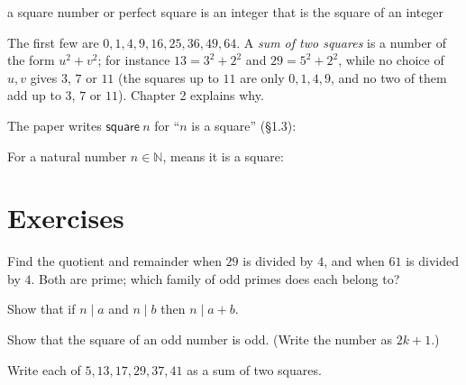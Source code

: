 \bpush\begin{bquote}

a square number or perfect
square is an integer that is the square of an integer

\end{bquote}\bpop

The first few are \(0, 1, 4, 9, 16, 25, 36, 49, 64\). A \emph{sum of two
squares} is a number of the form \(u^2 + v^2\); for instance
\(13 = 3^2 + 2^2\) and \(29 = 5^2 + 2^2\), while no choice of \(u, v\)
gives \(3\), \(7\) or \(11\) (the squares up to \(11\) are only
\(0, 1, 4, 9\), and no two of them add up to \(3\), \(7\) or \(11\)).
Chapter 2 explains why.

\bpush\begin{binpaper}

The paper writes \(\mathsf{square}\ n\) for ``\(n\) is a square''
(§1.3):

\bpush\begin{bquote}

For a natural number
\(n \in \mathbb{N}\), 
means it is a square:

\end{bquote}\bpop

\end{binpaper}\bpop

\hypertarget{exercises}{%
\section{Exercises}\label{exercises}}

\bpush\begin{bexercise}

Find the quotient and remainder when \(29\) is divided by \(4\), and
when \(61\) is divided by \(4\). Both are prime; which family of odd
primes does each belong to?

\end{bexercise}\bpop

\bpush\begin{bexercise}

Show that if \(n \mid a\) and \(n \mid b\) then \(n \mid a + b\).

\end{bexercise}\bpop

\bpush\begin{bexercise}

Show that the square of an odd number is odd. (Write the number as
\(2k + 1\).)

\end{bexercise}\bpop

\bpush\begin{bexercise}

Write each of \(5, 13, 17, 29, 37, 41\) as a sum of two squares.

\end{bexercise}\bpop
